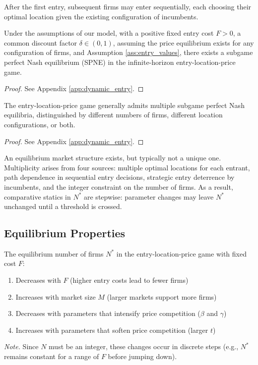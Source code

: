 \documentclass{article}
\begin{document}
After the first entry, subsequent firms may enter sequentially, each choosing their optimal location given the existing configuration of incumbents.

\begin{theorem}
  \label{thm:existence_entry}
  Under the assumptions of our model, with a positive fixed entry cost $F > 0$, a common discount factor $\delta \in (0,1)$, assuming the price equilibrium exists for any configuration of firms, and Assumption \ref{ass:entry_values}, there exists a subgame perfect Nash equilibrium (SPNE) in the infinite-horizon entry-location-price game.
\end{theorem}

\begin{proof}
  See Appendix \ref{app:dynamic_entry}.
\end{proof}

\begin{theorem}
  \label{thm:non_uniqueness_entry}
  The entry-location-price game generally admits multiple subgame perfect Nash equilibria, distinguished by different numbers of firms, different location configurations, or both.
\end{theorem}

\begin{proof}
  See Appendix \ref{app:dynamic_entry}.
\end{proof}

An equilibrium market structure exists, but typically not a unique one. Multiplicity arises from four sources: multiple optimal locations for each entrant, path dependence in sequential entry decisions, strategic entry deterrence by incumbents, and the integer constraint on the number of firms. As a result, comparative statics in $N^*$ are stepwise: parameter changes may leave $N^*$ unchanged until a threshold is crossed.

\subsection*{Equilibrium Properties}

\begin{proposition}
  \label{prop:market_structure}
  The equilibrium number of firms $N^*$ in the entry-location-price game with fixed cost $F$:
  \begin{enumerate}
    \item Decreases with $F$ (higher entry costs lead to fewer firms)
    \item Increases with market size $M$ (larger markets support more firms)
    \item Decreases with parameters that intensify price competition ($\beta$ and $\gamma$)
    \item Increases with parameters that soften price competition (larger $t$)
  \end{enumerate}
  \medskip
  \noindent\emph{Note.} Since $N$ must be an integer, these changes occur in discrete steps (e.g., $N^*$ remains constant for a range of $F$ before jumping down).
\end{proposition}
\end{document}
